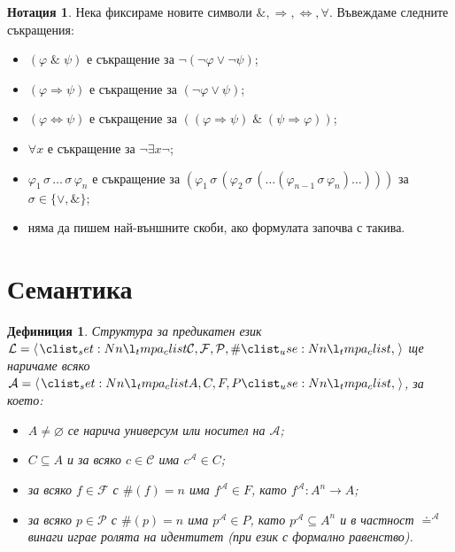 \documentclass[12pt]{article}
\newcommand{\logand}{\; \& \;}
\newcommand{\calA}{\mathcal{A}}
\newcommand{\calL}{\mathcal{L}}
\newcommand{\calF}{\mathcal{F}}
\newcommand{\calP}{\mathcal{P}}
\newcommand{\calC}{\mathcal{C}}
\newtheorem*{definition}{Дефиниция}
\theoremstyle{definition}
\newtheorem*{notation}{Нотация}
\begin{document}
\begin{notation}
    Нека фиксираме новите символи $\&, \Rightarrow, \Leftrightarrow, \forall$.
    Въвеждаме следните съкращения:
    \begin{itemize}
        \item $(\varphi \logand \psi)$ е съкращение за $\neg (\neg \varphi \lor \neg \psi)$;
        \item $(\varphi \Rightarrow \psi)$ е съкращение за $(\neg \varphi \lor \psi)$;
        \item $(\varphi \Leftrightarrow \psi)$ е съкращение за $((\varphi \Rightarrow \psi) \logand (\psi \Rightarrow \varphi))$;
        \item $\forall x$ е съкращение за $\neg \exists x \neg$;
        \item $\varphi_1 \, \sigma \, \dots \, \sigma \, \varphi_n$ е съкращение за $(\varphi_1 \, \sigma \, (\varphi_2 \, \sigma \, (\dots (\varphi_{n - 1} \, \sigma \, \varphi_n) \dots )))$ за $\sigma \in \{ \lor, \& \}$;
        \item няма да пишем най-външните скоби, ако формулата започва с такива.
    \end{itemize}
\end{notation}

\newpage

\section{Семантика}

\begin{definition}
    Структура за предикатен език $\calL = \opair{\calC, \calF, \calP, \#}$ ще наричаме всяко $\calA = \opair{A, C, F, P}$, за което:
    \begin{itemize}
        \item $A \neq \varnothing$ се нарича универсум или носител на $\calA$;
        \item $C \subseteq A$ и за всяко $c \in \calC$ има $c^\calA \in C$;
        \item за всяко $f \in \calF$ с $\#(f) = n$ има $f^\calA \in F$, като $f^\calA : A^n \rightarrow A$;
        \item за всяко $p \in \calP$ с $\#(p) = n$ има $p^\calA \in P$, като $p^\calA \subseteq A^n$ и в частност $\doteq^\calA$ винаги играе ролята на идентитет (при език с формално равенство).
    \end{itemize}
\end{definition}
\end{document}
